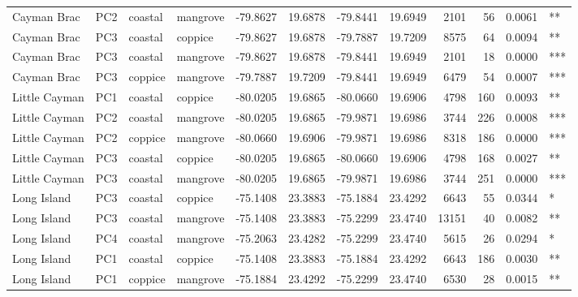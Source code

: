 \begin{tabular}{llllrrrrrrrl}
Cayman Brac & PC2 & coastal & mangrove & -79.8627 & 19.6878 & -79.8441 & 19.6949 & 2101 & 56 & 0.0061 & **\\
Cayman Brac & PC3 & coastal & coppice & -79.8627 & 19.6878 & -79.7887 & 19.7209 & 8575 & 64 & 0.0094 & **\\
Cayman Brac & PC3 & coastal & mangrove & -79.8627 & 19.6878 & -79.8441 & 19.6949 & 2101 & 18 & 0.0000 & ***\\
Cayman Brac & PC3 & coppice & mangrove & -79.7887 & 19.7209 & -79.8441 & 19.6949 & 6479 & 54 & 0.0007 & ***\\
Little Cayman & PC1 & coastal & coppice & -80.0205 & 19.6865 & -80.0660 & 19.6906 & 4798 & 160 & 0.0093 & **\\
Little Cayman & PC2 & coastal & mangrove & -80.0205 & 19.6865 & -79.9871 & 19.6986 & 3744 & 226 & 0.0008 & ***\\
Little Cayman & PC2 & coppice & mangrove & -80.0660 & 19.6906 & -79.9871 & 19.6986 & 8318 & 186 & 0.0000 & ***\\
Little Cayman & PC3 & coastal & coppice & -80.0205 & 19.6865 & -80.0660 & 19.6906 & 4798 & 168 & 0.0027 & **\\
Little Cayman & PC3 & coastal & mangrove & -80.0205 & 19.6865 & -79.9871 & 19.6986 & 3744 & 251 & 0.0000 & ***\\
Long Island & PC3 & coastal & coppice & -75.1408 & 23.3883 & -75.1884 & 23.4292 & 6643 & 55 & 0.0344 & *\\
Long Island & PC3 & coastal & mangrove & -75.1408 & 23.3883 & -75.2299 & 23.4740 & 13151 & 40 & 0.0082 & **\\
Long Island & PC4 & coastal & mangrove & -75.2063 & 23.4282 & -75.2299 & 23.4740 & 5615 & 26 & 0.0294 & *\\
Long Island & PC1 & coastal & coppice & -75.1408 & 23.3883 & -75.1884 & 23.4292 & 6643 & 186 & 0.0030 & **\\
Long Island & PC1 & coppice & mangrove & -75.1884 & 23.4292 & -75.2299 & 23.4740 & 6530 & 28 & 0.0015 & **\\
\bottomrule
\end{tabular}
